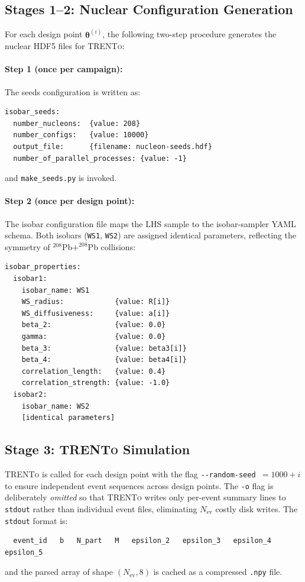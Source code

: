 \documentclass[12pt,a4paper,twoside]{report}
\newcommand{\trento}{\textsc{TRENTo}\xspace}
\newcommand{\PbPb}{$^{208}$Pb$+^{208}$Pb\xspace}
\begin{document}
\subsection{Stages 1--2: Nuclear Configuration Generation}
\label{subsec:stages12}

For each design point $\bm{\theta}^{(i)}$, the following two-step
procedure generates the nuclear HDF5 files for \trento:

\paragraph{Step 1 (once per campaign):}
The seeds configuration is written as:
\begin{verbatim}
isobar_seeds:
  number_nucleons:  {value: 208}
  number_configs:   {value: 10000}
  output_file:      {filename: nucleon-seeds.hdf}
  number_of_parallel_processes: {value: -1}
\end{verbatim}
and \texttt{make\_seeds.py} is invoked.

\paragraph{Step 2 (once per design point):}
The isobar configuration file maps the LHS sample to the
isobar-sampler YAML schema.  Both isobars (\texttt{WS1},
\texttt{WS2}) are assigned identical parameters, reflecting the
symmetry of \PbPb collisions:
\begin{verbatim}
isobar_properties:
  isobar1:
    isobar_name: WS1
    WS_radius:            {value: R[i]}
    WS_diffusiveness:     {value: a[i]}
    beta_2:               {value: 0.0}
    gamma:                {value: 0.0}
    beta_3:               {value: beta3[i]}
    beta_4:               {value: beta4[i]}
    correlation_length:   {value: 0.4}
    correlation_strength: {value: -1.0}
  isobar2:
    isobar_name: WS2
    [identical parameters]
\end{verbatim}

\subsection{Stage 3: \trento Simulation}
\label{subsec:stage3}

\trento is called for each design point with the flag
\texttt{-{}-random-seed $= 1000 + i$} to ensure independent event
sequences across design points.  The \texttt{-o} flag is deliberately
\emph{omitted} so that \trento writes only per-event summary lines to
\texttt{stdout} rather than individual event files, eliminating
$N_\mathrm{ev}$ costly disk writes.  The \texttt{stdout} format is:
\begin{verbatim}
  event_id   b   N_part   M   epsilon_2   epsilon_3   epsilon_4   epsilon_5
\end{verbatim}
and the parsed array of shape
$(N_\mathrm{ev}, 8)$ is cached as a compressed \texttt{.npy} file.
\end{document}
